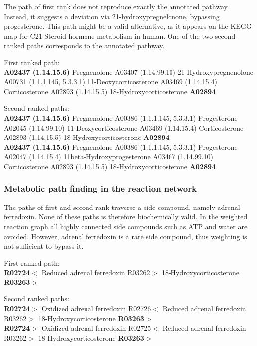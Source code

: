 The path of first rank does not reproduce exactly the annotated pathway. Instead, it suggests a deviation via 21-hydroxypregnelonone,
bypassing progesterone. This path might be a valid alternative, as it appears on the KEGG map for
C21-Steroid hormone metabolism in human. One of the two second-ranked paths corresponds to the annotated pathway.

First ranked path:\\
\textbf{A02437 (1.14.15.6)} Pregnenolone A03407 (1.14.99.10) 21-Hydroxypregnenolone A00731 (1.1.1.145, 5.3.3.1) 11-Deoxycorticosterone A03469 (1.14.15.4) Corticosterone A02893 (1.14.15.5) 18-Hydroxycorticosterone \textbf{A02894}

Second ranked paths:\\
\textbf{A02437 (1.14.15.6)} Pregnenolone A00386 (1.1.1.145, 5.3.3.1) Progesterone A02045 (1.14.99.10) 11-Deoxycorticosterone A03469 (1.14.15.4) Corticosterone A02893 (1.14.15.5) 18-Hydroxycorticosterone \textbf{A02894}\\

\textbf{A02437 (1.14.15.6)} Pregnenolone A00386 (1.1.1.145, 5.3.3.1) Progesterone A02047 (1.14.15.4) 11beta-Hydroxyprogesterone A03467 (1.14.99.10) Corticosterone A02893 (1.14.15.5) 18-Hydroxycorticosterone \textbf{A02894}

\subsubsection{Metabolic path finding in the reaction network}

The paths of first and second rank traverse a side compound, namely adrenal ferredoxin. None of these paths is therefore biochemically valid.
In the weighted reaction graph all highly connected side compounds such as ATP and water are avoided. However, adrenal ferredoxin
is a rare side compound, thus weighting is not sufficient to bypass it.

First ranked path:\\
\textbf{R02724$<$} Reduced adrenal ferredoxin R03262$>$ 18-Hydroxycorticosterone \textbf{R03263$>$}

Second ranked paths:\\

\textbf{R02724$>$} Oxidized adrenal ferredoxin R02726$<$ Reduced adrenal ferredoxin R03262$>$ 18-Hydroxycorticosterone \textbf{R03263$>$}\\

\textbf{R02724$>$} Oxidized adrenal ferredoxin R02725$<$ Reduced adrenal ferredoxin R03262$>$ 18-Hydroxycorticosterone \textbf{R03263$>$}


